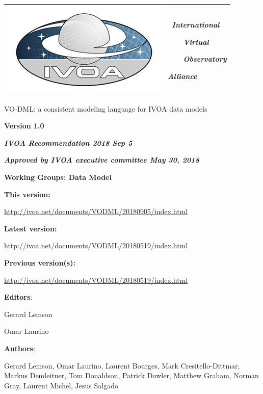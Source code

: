 \documentclass[10pt,a4paper]{ivoa}
\begin{document}
\begin{longtable}[]{@{}
  >{\raggedright\arraybackslash}p{}
  >{\raggedright\arraybackslash}p{}@{}}
\toprule
\endhead
\includegraphics{./media/image1.jpeg} & \emph{\textbf{~I}nternational}

\emph{\textbf{~~~ V}irtual}

\emph{\textbf{~ ~~O}bservatory}

\emph{\textbf{A}lliance} \\
\bottomrule
\end{longtable}

\protect\hypertarget{_Toc513524804}{}{}VO-DML: a consistent modeling
language for IVOA data models

\textbf{Version 1.0}

\emph{\textbf{IVOA Recommendation 2018 Sep 5}}

\emph{\textbf{Approved by IVOA executive committee May 30, 2018}}

\textbf{Working Groups: Data Model}

\textbf{This version:}

\url{http://ivoa.net/documents/VODML/20180905/index.html}

\textbf{Latest version:}

\url{http://ivoa.net/documents/VODML/20180519/index.html}

\textbf{Previous version(s):}

\url{http://ivoa.net/documents/VODML/20180519/index.html}

\textbf{Editors}:

Gerard Lemson

Omar Laurino

\textbf{Authors}:

Gerard Lemson, Omar Laurino, Laurent Bourges, Mark Cresitello-Dittmar,
Markus Demleitner, Tom Donaldson, Patrick Dowler, Matthew Graham, Norman
Gray, Laurent Michel, Jesus Salgado

\end{document}
